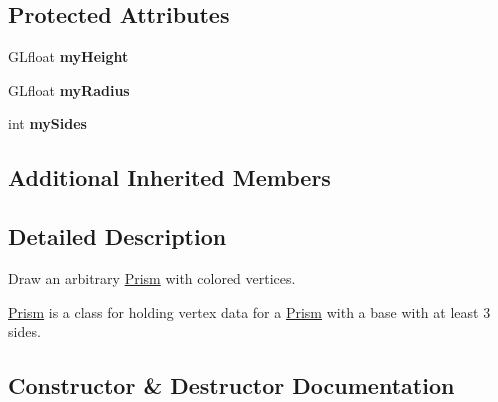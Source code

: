 \subsection*{Protected Attributes}
\begin{DoxyCompactItemize}
\item 
\mbox{\label{classtsgl_1_1_prism_a09331661d18ef6d374b4bc5a7660a1c6}} 
G\+Lfloat {\bfseries my\+Height}
\item 
\mbox{\label{classtsgl_1_1_prism_af5cc843f733123fe64b464ba45249d62}} 
G\+Lfloat {\bfseries my\+Radius}
\item 
\mbox{\label{classtsgl_1_1_prism_aa2b47e0792014dcca133846050b077ba}} 
int {\bfseries my\+Sides}
\end{DoxyCompactItemize}
\subsection*{Additional Inherited Members}


\subsection{Detailed Description}
Draw an arbitrary \hyperlink{classtsgl_1_1_prism}{Prism} with colored vertices. 

\hyperlink{classtsgl_1_1_prism}{Prism} is a class for holding vertex data for a \hyperlink{classtsgl_1_1_prism}{Prism} with a base with at least 3 sides. 

\subsection{Constructor \& Destructor Documentation}
\mbox{\label{classtsgl_1_1_prism_a4e4b0cdd81d76d48f032a691df2d81c2}} 
